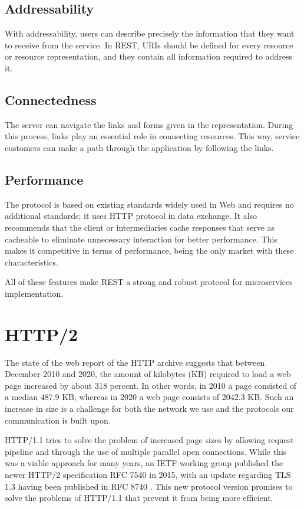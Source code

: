 \documentclass[conference]{IEEEtran}
\begin{document}
\subsection{Addressability}

With addressability, users can describe precisely the information that they want to receive from the service. In REST, URIs should be defined for every resource or resource representation, and they contain all information required to address it.

\subsection{Connectedness}

The server can navigate the links and forms given in the representation. During this process, links play an essential role in connecting resources. This way, service customers can make a path through the application by following the links.

\subsection{Performance}

The protocol is based on existing standards widely used in Web and requires no additional standards; it uses HTTP protocol in data exchange. It also recommends that the client or intermediaries cache responses that serve as cacheable to eliminate unnecessary interaction for better performance. This makes it competitive in terms of performance, being the only market with these characteristics.

All of these features make REST a strong and robust protocol for microservices implementation.

\section{HTTP/2}

The state of the web report of the HTTP archive \cite{httpArchive} suggests that between December 2010 and 2020, the amount of kilobytes (KB) required to load a web page increased by about 318 percent. In other words, in 2010 a page consisted of a median 487.9 KB, whereas in 2020 a web page consists of 2042.3 KB. Such an increase in size is a challenge for both the network we use and the protocols our communication is built upon.

HTTP/1.1 tries to solve the problem of increased page sizes by allowing request pipeline and through the use of multiple parallel open connections. While this was a viable approach for many years, an IETF working group published the newer HTTP/2 specification RFC 7540 \cite{rfc7540} in 2015, with an update regarding TLS 1.3 having been published in RFC 8740 \cite{rfc8740}. This new protocol version promises to solve the problems of HTTP/1.1 that prevent it from being more efficient.
\end{document}
